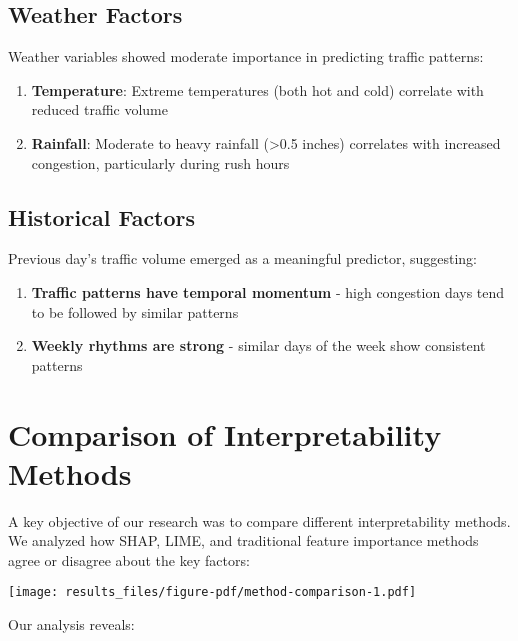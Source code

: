 \documentclass[
  letterpaper,
  DIV=11,
  numbers=noendperiod]{scrreprt}
\providecommand{\tightlist}{%
  \setlength{\itemsep}{0pt}\setlength{\parskip}{0pt}}\usepackage{longtable,booktabs,array}
\begin{document}
\subsection{Weather Factors}\label{weather-factors}

Weather variables showed moderate importance in predicting traffic
patterns:

\begin{enumerate}
\def\labelenumi{\arabic{enumi}.}
\tightlist
\item
  \textbf{Temperature}: Extreme temperatures (both hot and cold)
  correlate with reduced traffic volume
\item
  \textbf{Rainfall}: Moderate to heavy rainfall (\textgreater0.5 inches)
  correlates with increased congestion, particularly during rush hours
\end{enumerate}

\subsection{Historical Factors}\label{historical-factors}

Previous day's traffic volume emerged as a meaningful predictor,
suggesting:

\begin{enumerate}
\def\labelenumi{\arabic{enumi}.}
\tightlist
\item
  \textbf{Traffic patterns have temporal momentum} - high congestion
  days tend to be followed by similar patterns
\item
  \textbf{Weekly rhythms are strong} - similar days of the week show
  consistent patterns
\end{enumerate}

\section{Comparison of Interpretability
Methods}\label{comparison-of-interpretability-methods}

A key objective of our research was to compare different
interpretability methods. We analyzed how SHAP, LIME, and traditional
feature importance methods agree or disagree about the key factors:

\texttt{[image: results\_files/figure-pdf/method-comparison-1.pdf]}

Our analysis reveals:
\end{document}
